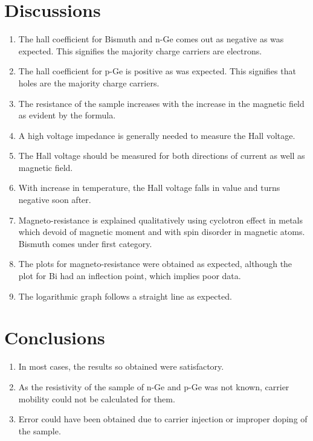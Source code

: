 \documentclass[%
 aip,
 amsmath,amssymb,
 reprint,%
]{revtex4-1}
\begin{document}
\section{Discussions}
\begin{enumerate}
    \item The hall coefficient for Bismuth and n-Ge comes out as negative as was expected. This signifies the majority charge carriers are electrons.
    \item The hall coefficient for p-Ge is positive as was expected. This signifies that holes are the majority charge carriers.
    \item The resistance of the sample increases with the increase in the magnetic field as evident by the formula.
    \item A high voltage impedance is generally needed to measure the Hall voltage.
    \item The Hall voltage should be measured for both directions of current as well as magnetic field.
    \item With increase in temperature, the Hall voltage falls in value and turns negative soon after.
    \item Magneto-resistance is explained qualitatively using cyclotron effect in metals which devoid of magnetic moment and with spin disorder in magnetic atoms. Bismuth comes under first category.
    \item The plots for magneto-resistance were obtained as expected, although the plot for Bi had an inflection point, which implies poor data.
    \item The logarithmic graph follows a straight line as expected.
\end{enumerate}

\section{Conclusions}
\begin{enumerate}
    \item In most cases, the results so obtained were satisfactory.
    \item As the resistivity of the sample of n-Ge and p-Ge was not known, carrier mobility could not be calculated for them.
    \item Error could have been obtained due to carrier injection or improper doping of the sample.
\end{enumerate}

\nocite{*}
\end{document}
